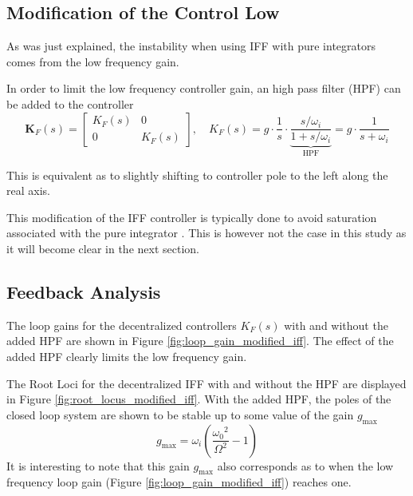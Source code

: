 \documentclass{ISMA_USD2020}
\begin{document}
\subsection{Modification of the Control Low}
\label{sec:orgd5972ba}
As was just explained, the instability when using IFF with pure integrators comes from the low frequency gain.

In order to limit the low frequency controller gain, an high pass filter (HPF) can be added to the controller
\begin{equation}
\label{eq:IFF_LHF}
  \bm{K}_F(s) = \begin{bmatrix} K_F(s) & 0 \\ 0 & K_F(s) \end{bmatrix}, \quad K_{F}(s) = g \cdot \frac{1}{s} \cdot \underbrace{\frac{s/\omega_i}{1 + s/\omega_i}}_{\text{HPF}} = g \cdot \frac{1}{s + \omega_i}
\end{equation}

This is equivalent as to slightly shifting to controller pole to the left along the real axis.

This modification of the IFF controller is typically done to avoid saturation associated with the pure integrator \cite{preumont91_activ}.
This is however not the case in this study as it will become clear in the next section.

\subsection{Feedback Analysis}
\label{sec:org51db5d4}
The loop gains for the decentralized controllers \(K_F(s)\) with and without the added HPF are shown in Figure \ref{fig:loop_gain_modified_iff}.
The effect of the added HPF clearly limits the low frequency gain.

The Root Loci for the decentralized IFF with and without the HPF are displayed in Figure \ref{fig:root_locus_modified_iff}.
With the added HPF, the poles of the closed loop system are shown to be stable up to some value of the gain \(g_\text{max}\)
\begin{equation}
\label{eq:gmax_iff_hpf}
  g_{\text{max}} = \omega_i \left( \frac{{\omega_0}^2}{\Omega^2} - 1 \right)
\end{equation}
It is interesting to note that this gain \(g_{\text{max}}\) also corresponds as to when the low frequency loop gain (Figure \ref{fig:loop_gain_modified_iff}) reaches one.
\end{document}

